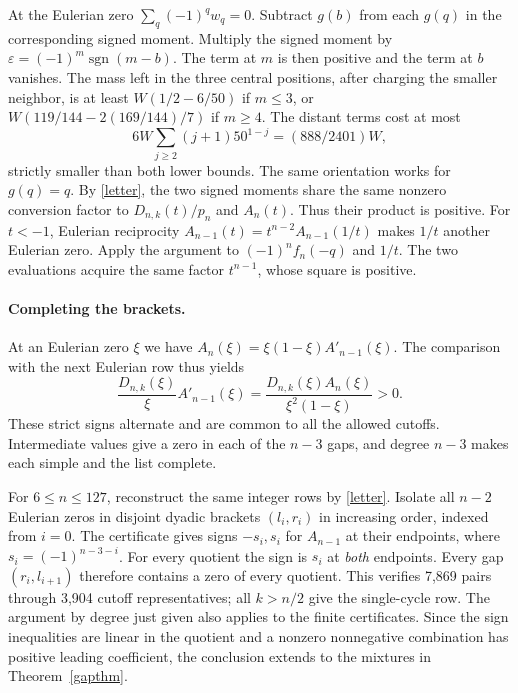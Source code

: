 At the Eulerian zero $\sum_q(-1)^qw_q=0$. Subtract $g(b)$ from each $g(q)$ in the corresponding signed moment. Multiply the signed moment by $\varepsilon=(-1)^m\operatorname{sgn}(m-b)$. The term at $m$ is then positive and the term at $b$ vanishes. The mass left in the three central positions, after charging the smaller neighbor, is at least $W(1/2-6/50)$ if $m\le3$, or $W(119/144-2(169/144)/7)$ if $m\ge4$. The distant terms cost at most
\[
 6W\sum_{j\ge2}(j+1)50^{1-j}=(888/2401)W,
\]
strictly smaller than both lower bounds. The same orientation works for $g(q)=q$. By \eqref{letter}, the two signed moments share the same nonzero conversion factor to $D_{n,k}(t)/p_n$ and $A_n(t)$. Thus their product is positive. For $t<-1$, Eulerian reciprocity $A_{n-1}(t)=t^{n-2}A_{n-1}(1/t)$ makes $1/t$ another Eulerian zero. Apply the argument to $(-1)^nf_n(-q)$ and $1/t$. The two evaluations acquire the same factor $t^{n-1}$, whose square is positive.

\paragraph{Completing the brackets.}
At an Eulerian zero $\xi$ we have $A_n(\xi)=\xi(1-\xi)A'_{n-1}(\xi)$. The comparison with the next Eulerian row thus yields
\[
 \frac{D_{n,k}(\xi)}{\xi}A'_{n-1}(\xi)
 =\frac{D_{n,k}(\xi)A_n(\xi)}{\xi^2(1-\xi)}>0 .
\] These strict signs alternate and are common to all the allowed cutoffs. Intermediate values give a zero in each of the $n-3$ gaps, and degree $n-3$ makes each simple and the list complete.

For $6\le n\le127$, reconstruct the same integer rows by \eqref{letter}. Isolate all $n-2$ Eulerian zeros in disjoint dyadic brackets $(l_i,r_i)$ in increasing order, indexed from $i=0$. The certificate gives signs $-s_i,s_i$ for $A_{n-1}$ at their endpoints, where $s_i=(-1)^{n-3-i}$. For every quotient the sign is $s_i$ at \emph{both} endpoints. Every gap $(r_i,l_{i+1})$ therefore contains a zero of every quotient. This verifies 7,869 pairs through 3,904 cutoff representatives; all $k>n/2$ give the single-cycle row. The argument by degree just given also applies to the finite certificates. Since the sign inequalities are linear in the quotient and a nonzero nonnegative combination has positive leading coefficient, the conclusion extends to the mixtures in Theorem~\ref{gapthm}.
